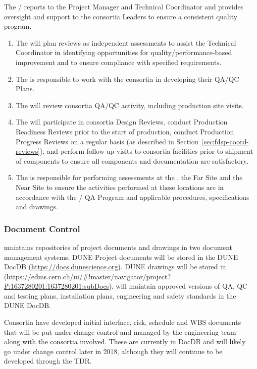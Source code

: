 The /  reports
to the  Project Manager and  Technical
Coordinator and provides oversight and support to the consortia
Leaders to ensure a consistent quality program.
\begin{enumerate}
  \item The  will plan reviews as independent assessments to assist
    the  Technical Coordinator in identifying opportunities for
    quality/performance-based improvement and to ensure compliance
    with specified requirements.
  \item The  is responsible to work with the consortia in
    developing their QA/QC Plans.
  \item The  will review consortia QA/QC activity, including
    production site visits.
  \item The  will participate in consortia Design Reviews, conduct
    Production Readiness Reviews prior to the start of production,
    conduct Production Progress Reviews on a regular basis (as
    described in Section~\ref{sec:fdsp-coord-reviews}), and perform
    follow-up visits to consortia facilities prior to shipment of
    components to ensure all components and documentation are
    satisfactory.
\item The  is responsible for performing assessments at the
  , the Far Site and the Near Site to
  ensure the activities performed at these locations are in accordance
  with the / QA Program and applicable procedures,
  specifications and drawings.
\end{enumerate}

\subsubsection{Document Control}
\label{sec:fdsp-coord-document}

 maintains repositories of project documents and drawings in two
document management systems.  DUNE Project documents will be stored in
the DUNE DocDB (\url{https://docs.dunescience.org}). DUNE drawings
will be stored in 
(\url{https://edms.cern.ch/ui/#!master/navigator/project?P:1637280201:1637280201:subDocs}).
 will maintain approved versions of QA, QC and testing plans,
installation plans, engineering and safety standards in the DUNE
DocDB.

Consortia have developed initial interface, risk, schedule and WBS
documents that will be put under change control and managed by the 
engineering team along with the consortia involved. These
are currently in DocDB and will likely go under change control later
in 2018, although they will continue to be developed through the TDR.

